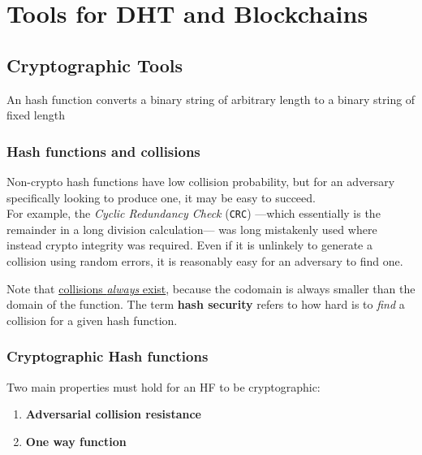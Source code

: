 \chapter{Tools for DHT and Blockchains}
\section{Cryptographic Tools}
\begin{definition}
   An hash function converts a binary string of arbitrary length to a binary string of fixed length
\end{definition}

\subsection{Hash functions and collisions}
Non-crypto hash functions have low collision probability, but for an adversary specifically looking to produce one, it may be easy to succeed.\\
For example, the \textit{Cyclic Redundancy Check} (\texttt{CRC}) ---which essentially is the remainder in a long division calculation--- was long mistakenly used where instead crypto integrity was required.
Even if it is unlinkely to generate a collision using random errors, it is reasonably easy for an adversary to find one. 

Note that \ul{collisions \textit{always} exist}, because the codomain is always smaller than the domain of the function.
The term \textbf{hash security} refers to how hard is to \textit{find} a collision for a given hash function.

\subsection{Cryptographic Hash functions}
Two main properties must hold for an HF to be cryptographic:
\begin{enumerate}
   \item \textbf{Adversarial collision resistance}
   \item \textbf{One way function}
\end{enumerate}

